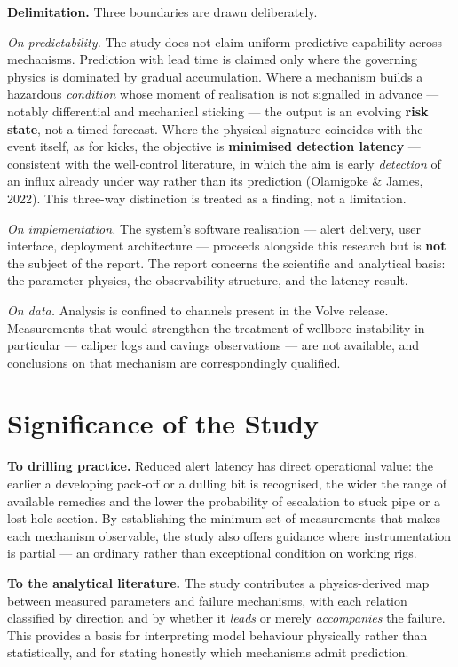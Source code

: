 \documentclass[12pt,a4paper]{report}
\begin{document}
\textbf{Delimitation.} Three boundaries are drawn deliberately.

\emph{On predictability.} The study does not claim uniform predictive capability across mechanisms. Prediction
with lead time is claimed only where the governing physics is dominated by gradual accumulation. Where a
mechanism builds a hazardous \emph{condition} whose moment of realisation is not signalled in advance --- notably
differential and mechanical sticking --- the output is an evolving \textbf{risk state}, not a timed forecast.
Where the physical signature coincides with the event itself, as for kicks, the objective is \textbf{minimised
detection latency} --- consistent with the well-control literature, in which the aim is early \emph{detection} of
an influx already under way rather than its prediction (Olamigoke \& James, 2022). This three-way
distinction is treated as a finding, not a limitation.

\emph{On implementation.} The system's software realisation --- alert delivery, user interface, deployment
architecture --- proceeds alongside this research but is \textbf{not} the subject of the report. The report
concerns the scientific and analytical basis: the parameter physics, the observability structure, and the
latency result.

\emph{On data.} Analysis is confined to channels present in the Volve release. Measurements that would
strengthen the treatment of wellbore instability in particular --- caliper logs and cavings observations ---
are not available, and conclusions on that mechanism are correspondingly qualified.

\section{Significance of the Study}

\textbf{To drilling practice.} Reduced alert latency has direct operational value: the earlier a developing
pack-off or a dulling bit is recognised, the wider the range of available remedies and the lower the
probability of escalation to stuck pipe or a lost hole section. By establishing the minimum set of
measurements that makes each mechanism observable, the study also offers guidance where instrumentation is
partial --- an ordinary rather than exceptional condition on working rigs.

\textbf{To the analytical literature.} The study contributes a physics-derived map between measured parameters
and failure mechanisms, with each relation classified by direction and by whether it \emph{leads} or merely
\emph{accompanies} the failure. This provides a basis for interpreting model behaviour physically rather than
statistically, and for stating honestly which mechanisms admit prediction.
\end{document}
